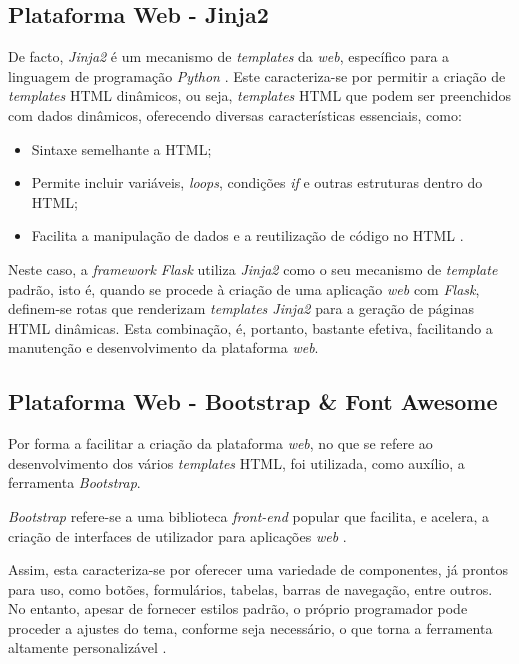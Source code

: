 \subsection{Plataforma Web - Jinja2}
De facto, \textit{Jinja2} é um mecanismo de \textit{templates} da \textit{web}, específico para a linguagem de programação \textit{Python} \cite{Jinja2022}. Este caracteriza-se por permitir a criação de \textit{templates} HTML dinâmicos, ou seja, \textit{templates} HTML que podem ser preenchidos com dados dinâmicos, oferecendo diversas características essenciais, como:
\begin{itemize}
    \item Sintaxe semelhante a HTML;
    \item Permite incluir variáveis, \textit{loops}, condições \textit{if} e outras estruturas dentro do HTML;
    \item Facilita a manipulação de dados e a reutilização de código no HTML \cite{Jinja2022}.
\end{itemize}

Neste caso, a \textit{framework Flask} utiliza \textit{Jinja2} como o seu mecanismo de \textit{template} padrão, isto é, quando se procede à criação de uma aplicação \textit{web} com \textit{Flask}, definem-se rotas que renderizam \textit{templates Jinja2} para a geração de páginas HTML dinâmicas. Esta combinação, é, portanto, bastante efetiva, facilitando a manutenção e desenvolvimento da plataforma \textit{web}.

\subsection{Plataforma Web - Bootstrap \& Font Awesome}

Por forma a facilitar a criação da plataforma \textit{web}, no que se refere ao desenvolvimento dos vários \textit{templates} HTML, foi utilizada, como auxílio, a ferramenta \textit{Bootstrap}.

\textit{Bootstrap} refere-se a uma biblioteca \textit{front-end} popular que facilita, e acelera, a criação de interfaces de utilizador para aplicações \textit{web} \cite{Bootstrap2024}. 

Assim, esta caracteriza-se por oferecer uma variedade de componentes, já prontos para uso, como botões, formulários, tabelas, barras de navegação, entre outros. No entanto, apesar de fornecer estilos padrão, o próprio programador pode proceder a ajustes do tema, conforme seja necessário, o que torna a ferramenta altamente personalizável \cite{Bootstrap2024}.


